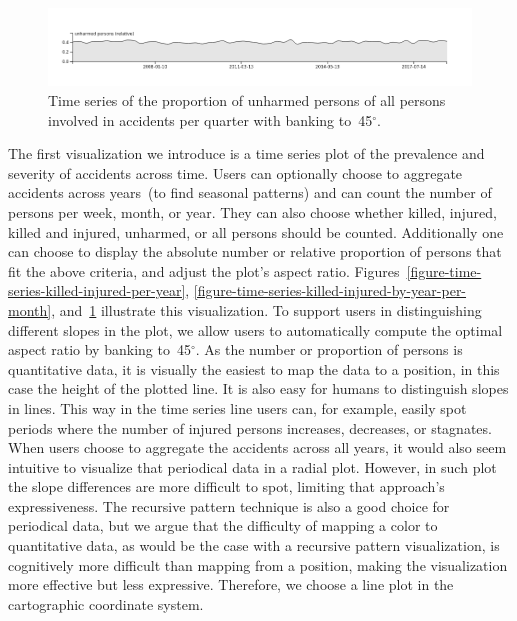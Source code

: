 \begin{figure}
    \centering
    \includegraphics[width=0.9\linewidth]{figures/time-series-banking-45-unharmed-relative-never-per-quarter.png}
    \caption{Time series of the proportion of unharmed persons of all persons involved in accidents per quarter with banking to~45\(^\circ\).}
    \label{figure-time-series-banking-unharmed-relative-per-quarter}
\end{figure}
The first visualization we introduce is a time series plot of the prevalence and severity of accidents across time.
Users can optionally choose to aggregate accidents across years~(to find seasonal patterns) and can count the number of persons per week, month, or year. They can also choose whether killed, injured, killed and injured, unharmed, or all persons should be counted. Additionally one can choose to display the absolute number or relative proportion of persons that fit the above criteria, and adjust the plot's aspect ratio.
Figures~\ref{figure-time-series-killed-injured-per-year}, \ref{figure-time-series-killed-injured-by-year-per-month}, and~\ref{figure-time-series-banking-unharmed-relative-per-quarter} illustrate this visualization.
To support users in distinguishing different slopes in the plot, we allow users to automatically compute the optimal aspect ratio by banking to~45\(^\circ\).
As the number or proportion of persons is quantitative data, it is visually the easiest to map the data to a position, in this case the height of the plotted line. It is also easy for humans to distinguish slopes in lines. This way in the time series line users can, for example, easily spot periods where the number of injured persons increases, decreases, or stagnates.
When users choose to aggregate the accidents across all years, it would also seem intuitive to visualize that periodical data in a radial plot. However, in such plot the slope differences are more difficult to spot, limiting that approach's expressiveness. The recursive pattern technique is also a good choice for periodical data, but we argue that the difficulty of mapping a color to quantitative data, as would be the case with a recursive pattern visualization, is cognitively more difficult than mapping from a position, making the visualization more effective but less expressive. Therefore, we choose a line plot in the cartographic coordinate system.

